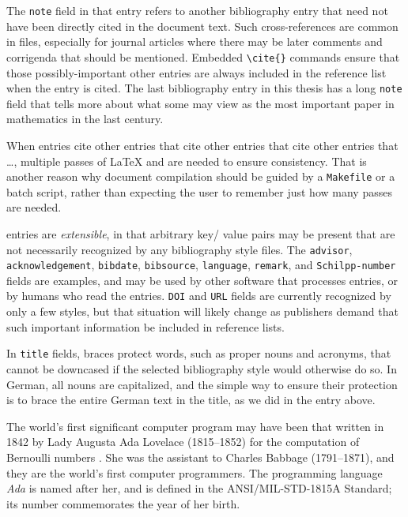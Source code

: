 The \verb=note= field in that entry refers to another bibliography
entry that need not have been directly cited in the document text.
Such cross-references are common in \BibTeX{} files, especially for
journal articles where there may be later comments and corrigenda that
should be mentioned.  Embedded \verb=\cite{}= commands ensure that
those possibly-important other entries are always included in the
reference list when the entry is cited.  The last bibliography entry
\cite{Wiles:1995:MEC} in this thesis has a long \verb=note= field
that tells more about what some may view as the most important paper
in mathematics in the last century.

When entries cite other entries that cite other entries that cite
other entries that \ldots{}, multiple passes of \LaTeX{} and \BibTeX{}
are needed to ensure consistency.  That is another reason why document
compilation should be guided by a \verb=Makefile= or a batch script,
rather than expecting the user to remember just how many passes are
needed.

\BibTeX{} entries are \emph{extensible}, in that arbitrary key\slash
value pairs may be present that are not necessarily recognized by any
bibliography style files.  The \verb=advisor=,
\verb=acknowledgement=, \verb=bibdate=, \verb=bibsource=,
\verb=language=, \verb=remark=, and \verb=Schilpp-number= fields
are examples, and may be used by other software that processes
\BibTeX{} entries, or by humans who read the entries.  \verb=DOI=
and \verb=URL= fields are currently recognized by only a few styles,
but that situation will likely change as publishers demand that such
important information be included in reference lists.

In \BibTeX{} \verb=title= fields, braces protect words, such as
proper nouns and acronyms, that cannot be downcased if the selected
bibliography style would otherwise do so.  In German, all nouns are
capitalized, and the simple way to ensure their protection is to brace
the entire German text in the title, as we did in the entry above.

The world's first significant computer program may
have been that written in 1842 by Lady Augusta Ada
Lovelace%
(1815--1852) for the computation of Bernoulli
numbers \cite{Huskey:1980:LLC,Kim:1999:AFC}.  She
was the assistant to Charles Babbage%
(1791--1871), and they are the world's first
computer programmers. The programming language
\emph{Ada} is named after her, and is defined in
the ANSI/MIL-STD-1815A Standard; its number
commemorates the year of her birth.

